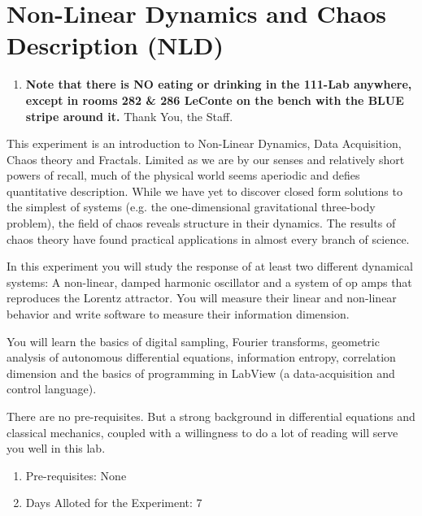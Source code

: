 \documentclass{../lab}
\begin{document}
\maketitle

\tableofcontents

\section{Non-Linear Dynamics and Chaos Description (NLD)}

\begin{enumerate}
    \item \textbf{Note that there is NO eating or drinking in the 111-Lab anywhere, except in rooms 282 \& 286 LeConte on the bench with the BLUE stripe around it.} Thank You, the Staff.
\end{enumerate}

This experiment is an introduction to Non-Linear Dynamics, Data Acquisition, Chaos theory and Fractals. Limited as we are by our senses and relatively short powers of recall, much of the physical world seems aperiodic and defies quantitative description. While we have yet to discover closed form solutions to the simplest of systems (e.g. the one-dimensional gravitational three-body problem), the field of chaos reveals structure in their dynamics. The results of chaos theory have found practical applications in almost every branch of science.

In this experiment you will study the response of at least two different dynamical systems: A non-linear, damped harmonic oscillator and a system of op amps that reproduces the Lorentz attractor. You will measure their linear and non-linear behavior and write software to measure their information dimension.

You will learn the basics of digital sampling, Fourier transforms, geometric analysis of autonomous differential equations, information entropy, correlation dimension and the basics of programming in LabView (a data-acquisition and control language).

There are no pre-requisites. But a strong background in differential equations and classical mechanics, coupled with a willingness to do a lot of reading will serve you well in this lab.

\begin{enumerate}
    \item Pre-requisites: None

    \item Days Alloted for the Experiment: 7

\end{enumerate}
\end{document}
